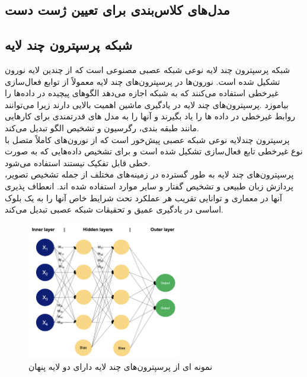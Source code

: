
\subsection{مدل‌های کلاس‌بندی برای تعیین ژست دست}

\subsection{شبکه پرسپترون چند لایه}
شبکه پرسپترون چند لایه  نوعی شبکه عصبی مصنوعی است که از چندین لایه نورون تشکیل شده است. نورون‌ها در پرسپترون‌های چند لایه  معمولاً از
توابع فعال‌سازی غیرخطی  استفاده می‌کنند که به شبکه اجازه می‌دهد الگوهای پیچیده در داده‌ها را بیاموزد .پرسپترون‌های چند لایه در 
یادگیری ماشین اهمیت بالایی دارند زیرا می‌توانند روابط غیرخطی در داده ها را یاد بگیرند و آنها را به مدل های قدرتمندی برای کارهایی مانند طبقه بندی، رگرسیون و تشخیص الگو تبدیل می‌کند. 
\\
پرسپترون چندلایه نوعی شبکه عصبی پیش‌خور است که از نورون‌های کاملاً متصل با نوع غیرخطی تابع فعال‌سازی تشکیل شده است و  برای تشخیص داده‌هایی که به صورت خطی قابل تفکیک نیستند استفاده می‌شود.
\\
پرسپترون‌های چند لایه به طور گسترده در زمینه‌های مختلف از جمله تشخیص تصویر، پردازش زبان طبیعی و تشخیص گفتار و سایر موارد استفاده شده اند. انعطاف پذیری آنها در
معماری و توانایی تقریب هر عملکرد تحت شرایط خاص آنها را به یک بلوک اساسی در یادگیری عمیق و تحقیقات شبکه عصبی تبدیل می‌کند. 

\begin{figure}[h]
    \centering
    \includegraphics[width=0.6\textwidth]{MLP.png}
    \caption{نمونه ای از پرسپترون‌های چند لایه دارای دو لایه پنهان}
\end{figure}


